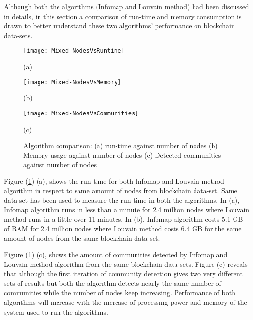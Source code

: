 Although both the algorithms (Infomap and Louvain method) had been discussed in details, in this section a comparison of run-time and memory consumption is drawn to better understand these two algorithms' performance on blockchain data-sets.

\begin{figure}[H]
  \centering
  \begin{minipage}[b]{0.4\textwidth}
    \texttt{[image: Mixed-NodesVsRuntime]}
    \caption*{(a)}
  \end{minipage}
  \begin{minipage}[b]{0.4\textwidth}
    \texttt{[image: Mixed-NodesVsMemory]}
    \caption*{(b)}
  \end{minipage}
  \begin{minipage}[b]{0.4\textwidth}
    \texttt{[image: Mixed-NodesVsCommunities]}
    \caption*{(c)}
  \end{minipage}
  \caption{Algorithm comparison: (a) run-time against number of nodes (b) Memory usage against number of nodes (c) Detected communities against number of nodes}
  \label{fig:algo-run-comparision}
\end{figure}

Figure (\ref{fig:algo-run-comparision}) (a), shows the run-time for both Infomap and Louvain method algorithm in respect to same amount of nodes from blockchain data-set. Same data set has been used to measure the run-time in both the algorithms. In (a), Infomap algorithm runs in less than a minute for 2.4 million nodes where Louvain method runs in a little over 11 minutes. In (b), Infomap algorithm costs 5.1 GB of RAM for 2.4 million nodes where Louvain method costs 6.4 GB for the same amount of nodes from the same blockchain data-set.

Figure (\ref{fig:algo-run-comparision}) (c), shows the amount of communities detected by Infomap and Louvain method algorithm from the same blockchain data-sets. Figure (c) reveals that although the first iteration of community detection gives two very different sets of results but both the algorithm detects nearly the same number of communities while the number of nodes keep increasing. Performance of both algorithms will increase with the increase of processing power and memory of the system used to run the algorithms.

